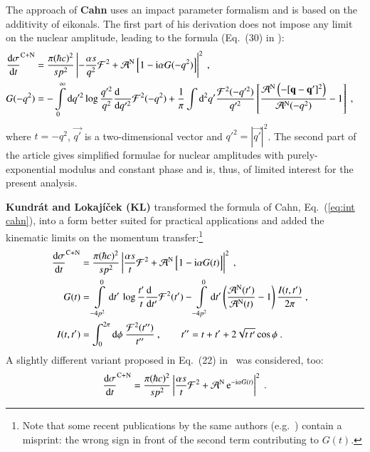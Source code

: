 The approach of {\bf Cahn} \cite{cahn82} uses an impact parameter formalism and is based on the additivity of eikonals. The first part of his derivation does not impose any limit on the nuclear amplitude, leading to the formula (Eq.~(30) in \cite{cahn82}):
\begin{equation}
\label{eq:int cahn}
	\begin{aligned}
		{\d\sigma\over \d t}^{\rm C+N} &= {\pi (\hbar c)^2 \over s p^2} \left | -{\alpha s\over q^2} {\cal F}^2
			+ {\cal A}^{\rm N}\, \Big[1 - \I\alpha G(-q^2)\Big] \right |^2\ ,\cr
		G(-q^2) &= - \int\limits_0^\infty \d q'^2 \log {q'^2\over q^2} {\d\phantom{q'^2}\over \d q'^2} {\cal F}^2(-q^2)
					+ {1\over\pi} \int\d^2 q' {{\cal F}^2(-q'^2)\over q'^2} \left[ {{\cal A}^{\rm N}\left(-[\vec{q} - \vec{q'}]^2\right) \over {\cal A}^{\rm N}(-q^2)} - 1 \right]
			\ , \cr
	\end{aligned}
\end{equation}
where $t=-q^2$, $\vec{q'}$ is a two-dimensional vector and $q'^2 = |\vec{q'}|^2$. The second part of the article gives simplified formulae for nuclear amplitudes with purely-exponential modulus and constant phase and is, thus, of limited interest for the present analysis.

{\bf Kundr\' at and Lokaj\' i\v cek (KL)} \cite{kl94} transformed the formula of Cahn, Eq.~(\ref{eq:int cahn}), into a form better suited for practical applications and added the kinematic limits on the momentum transfer:\footnote{%
Note that some recent publications by the same authors (e.g.~\cite{kl05,kklp11}) contain a misprint: the wrong sign in front of the second term contributing to $G(t)$.
}
\begin{equation}
\label{eq:int kl}
	\begin{aligned}
		{\d\sigma\over \d t}^{\rm C+N} &= {\pi (\hbar c)^2 \over s p^2} \left | {\alpha s\over t} {\cal F}^2
			+ {\cal A}^{\rm N}\, \Big[1 - \I\alpha G(t)\Big] \right |^2\ ,\cr
		G(t) &= 
			\int\limits_{-4p^2}^0 \d t'\, \log {t'\over t} {\d\phantom{t'}\over \d t'} {\cal F}^2(t')
			- \int\limits_{-4p^2}^0 \d t' \left( {{\cal A}^{\rm N}(t') \over {\cal A}^{\rm N}(t)} - 1 \right) { I(t, t')\over 2\pi }
			\ , \cr
		I(t, t') &= \int_0^{2\pi} \d\phi\ {{\cal F}^2(t'')\over t''}\ ,\qquad t'' = t + t' + 2\sqrt{t\, t'} \cos\phi\ .\cr
	\end{aligned}
\end{equation}
A slightly different variant proposed in Eq.~(22) in~\cite{kl05} was considered, too:
\begin{equation}
\label{eq:int kl exp}
	{\d\sigma\over \d t}^{\rm C+N} = {\pi (\hbar c)^2 \over s p^2} \left | {\alpha s\over t} {\cal F}^2
		+ {\cal A}^{\rm N}\, \e^{- \I\alpha G(t)} \right |^2 \ .
\end{equation}

